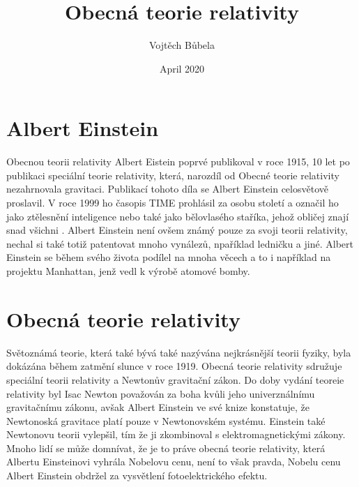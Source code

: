 \documentclass{article}
\title{Obecná teorie relativity}
\author{Vojtěch Bůbela}
\date{April 2020}
\begin{document}
\maketitle

\section{Albert Einstein}
Obecnou teorii relativity Albert Eistein poprvé publikoval v roce 1915, 10 let po publikaci speciální teorie relativity, která, narozdíl od Obecné teorie relativity nezahrnovala gravitaci\cite{online_article1}. Publikací tohoto díla se Albert Einstein celosvětově proslavil. V roce 1999 ho časopis TIME prohlásil za osobu století a  označil ho jako ztělesnění inteligence nebo také jako bělovlasého staříka, jehož obličej znají snad všichni \cite{Times}. Albert Einstein není ovšem známý pouze za svoji teorii relativity, nechal si také totiž patentovat mnoho vynálezů, npaříklad ledničku a jiné.\cite{albert_patents} Albert Einstein se během svého života podílel na mnoha věcech a to i například na projektu Manhattan, jenž vedl k výrobě atomové bomby.\cite{manhattan}

\section{Obecná teorie relativity}


Světoznámá teorie, která také bývá také nazývána nejkrásnější teorii fyziky, byla dokázána během zatmění slunce v roce 1919.\cite{ccf} Obecná teorie relativity sdružuje speciální teorii relativity a Newtonův gravitační zákon.\cite{wikipedia} Do doby vydání teoreie relativity byl Isac Newton považován za boha kvůli jeho univerználnímu gravitačnímu zákonu,\cite{nadherna_teorie} avšak Albert Einstein ve své knize konstatuje, že Newtonoská gravitace platí pouze v Newtonovském systému.\cite{relativity} Einstein také Newtonovu teorii vylepšil, tím že ji zkombinoval s elektromagnetickými zákony.\cite{foto2} Mnoho lidí se může domnívat, že je to práve obecná teorie relativity, která Albertu Einsteinovi vyhrála Nobelovu cenu, není to však pravda, Nobelu cenu Albert Einstein obdržel za vysvětlení fotoelektrického efektu.\cite{foto}

\newpage


\end{document}
